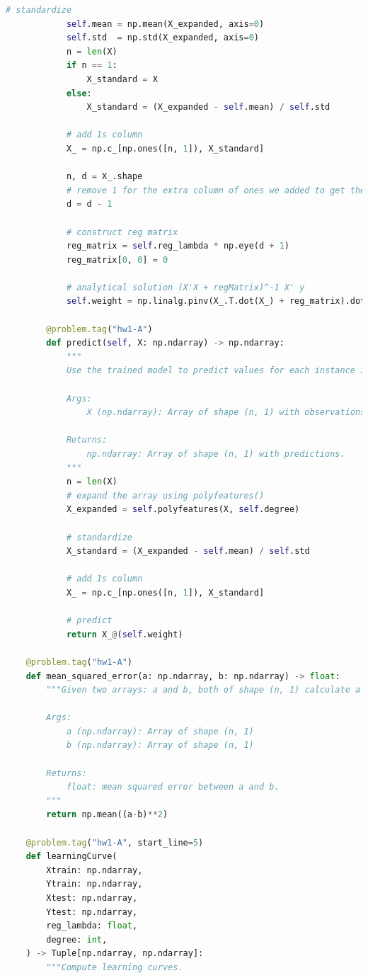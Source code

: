 \documentclass{article}
\begin{document}
\begin{lstlisting}[language=Python]
            # standardize
            self.mean = np.mean(X_expanded, axis=0)
            self.std  = np.std(X_expanded, axis=0)
            n = len(X)
            if n == 1:
                X_standard = X
            else:
                X_standard = (X_expanded - self.mean) / self.std

            # add 1s column
            X_ = np.c_[np.ones([n, 1]), X_standard]

            n, d = X_.shape
            # remove 1 for the extra column of ones we added to get the original num features
            d = d - 1

            # construct reg matrix
            reg_matrix = self.reg_lambda * np.eye(d + 1)
            reg_matrix[0, 0] = 0

            # analytical solution (X'X + regMatrix)^-1 X' y
            self.weight = np.linalg.pinv(X_.T.dot(X_) + reg_matrix).dot(X_.T).dot(y)

        @problem.tag("hw1-A")
        def predict(self, X: np.ndarray) -> np.ndarray:
            """
            Use the trained model to predict values for each instance in X.

            Args:
                X (np.ndarray): Array of shape (n, 1) with observations.

            Returns:
                np.ndarray: Array of shape (n, 1) with predictions.
            """
            n = len(X)
            # expand the array using polyfeatures()
            X_expanded = self.polyfeatures(X, self.degree)

            # standardize
            X_standard = (X_expanded - self.mean) / self.std

            # add 1s column
            X_ = np.c_[np.ones([n, 1]), X_standard]

            # predict
            return X_@(self.weight)

    @problem.tag("hw1-A")
    def mean_squared_error(a: np.ndarray, b: np.ndarray) -> float:
        """Given two arrays: a and b, both of shape (n, 1) calculate a mean squared error.

        Args:
            a (np.ndarray): Array of shape (n, 1)
            b (np.ndarray): Array of shape (n, 1)

        Returns:
            float: mean squared error between a and b.
        """
        return np.mean((a-b)**2)

    @problem.tag("hw1-A", start_line=5)
    def learningCurve(
        Xtrain: np.ndarray,
        Ytrain: np.ndarray,
        Xtest: np.ndarray,
        Ytest: np.ndarray,
        reg_lambda: float,
        degree: int,
    ) -> Tuple[np.ndarray, np.ndarray]:
        """Compute learning curves.


\end{lstlisting}
\end{document}
